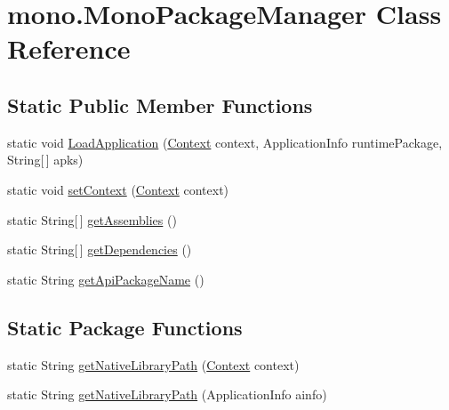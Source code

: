 \hypertarget{classmono_1_1_mono_package_manager}{
\section{mono.MonoPackageManager Class Reference}
\label{classmono_1_1_mono_package_manager}
}
\subsection*{Static Public Member Functions}
\begin{CompactItemize}
\item 
static void \hyperlink{classmono_1_1_mono_package_manager_5a2d5fc7f4891ab84e6deeae523686a2}{LoadApplication} (\hyperlink{classmono_1_1_mono_package_manager_5fdce295817dc558ee9bd80970675ad3}{Context} context, ApplicationInfo runtimePackage, String\mbox{[}$\,$\mbox{]} apks)
\item 
static void \hyperlink{classmono_1_1_mono_package_manager_d3ff1f574349729b27f86da6c25c0f55}{setContext} (\hyperlink{classmono_1_1_mono_package_manager_5fdce295817dc558ee9bd80970675ad3}{Context} context)
\item 
static String\mbox{[}$\,$\mbox{]} \hyperlink{classmono_1_1_mono_package_manager_4db80b0afa9fab894e267e09bc3da334}{getAssemblies} ()
\item 
static String\mbox{[}$\,$\mbox{]} \hyperlink{classmono_1_1_mono_package_manager_708931514353feff12f2cc9d99865a9e}{getDependencies} ()
\item 
static String \hyperlink{classmono_1_1_mono_package_manager_009d16dedf56862f4a23ee05e180e028}{getApiPackageName} ()
\end{CompactItemize}
\subsection*{Static Package Functions}
\begin{CompactItemize}
\item 
static String \hyperlink{classmono_1_1_mono_package_manager_4f1f811bd8f3954ebe3425b3aeec2522}{getNativeLibraryPath} (\hyperlink{classmono_1_1_mono_package_manager_5fdce295817dc558ee9bd80970675ad3}{Context} context)
\item 
static String \hyperlink{classmono_1_1_mono_package_manager_31c4187d99088755db423f5714aaf460}{getNativeLibraryPath} (ApplicationInfo ainfo)
\end{CompactItemize}

